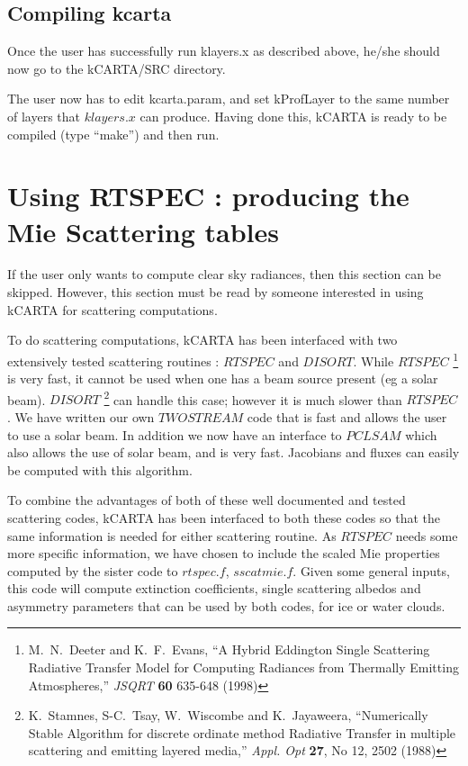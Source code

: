 \documentclass[12pt]{article}
\newcommand{\kc}{\textsf{kCARTA}\xspace}
\begin{document}
\subsection{Compiling kcarta}
Once the user has successfully run klayers.x as described above, he/she should
now go to the kCARTA/SRC directory. 

The user now has to edit kcarta.param, and set kProfLayer to the same number 
of layers that $klayers.x$ can produce. Having 
done this, \kc is ready to be compiled (type ``make'') and then run.

\section{Using RTSPEC : producing the Mie Scattering tables}
If the user only wants to compute clear sky radiances, then this section can 
be skipped. However, this section must be read by someone interested in using
\kc for scattering computations. 

To do scattering computations, \kc has been interfaced with two extensively
tested scattering routines : $RTSPEC$ and $DISORT$. While $RTSPEC$ 
\footnote{ M.~N.~Deeter and K.~F.~Evans, ``A Hybrid Eddington Single 
Scattering Radiative Transfer Model for Computing Radiances from Thermally 
Emitting Atmospheres,'' {\em JSQRT} {\bf 60} 635-648 (1998)}
is very fast, it cannot be used when one has a beam source present 
(eg a solar beam). $DISORT$ 
\footnote{ K.~Stamnes, S-C.~Tsay, W.~Wiscombe and K.~Jayaweera, ``Numerically
Stable Algorithm for discrete ordinate method Radiative Transfer in multiple
scattering and emitting layered media,'' {\em Appl. Opt} {\bf 27}, No 12, 2502
(1988)} can handle this case; however it is much slower than $RTSPEC$. We have
written our own $TWOSTREAM$ code that is fast and allows the user to use a
solar beam. In addition we now have an interface to $PCLSAM$ which also 
allows the use of solar beam, and is very fast. Jacobians and fluxes can easily
be computed with this algorithm.

To combine the advantages of both of these well documented and tested 
scattering codes, \kc has been interfaced to both these codes so that the 
same information is needed for either scattering routine. As $RTSPEC$ needs
some more specific information, we have chosen to include the scaled Mie
properties computed by the sister code to $rtspec.f$, $sscatmie.f$. Given
some general inputs, this code will compute extinction coefficients, single 
scattering albedos and asymmetry parameters that can be used by both codes,
for ice or water clouds.
\end{document}
